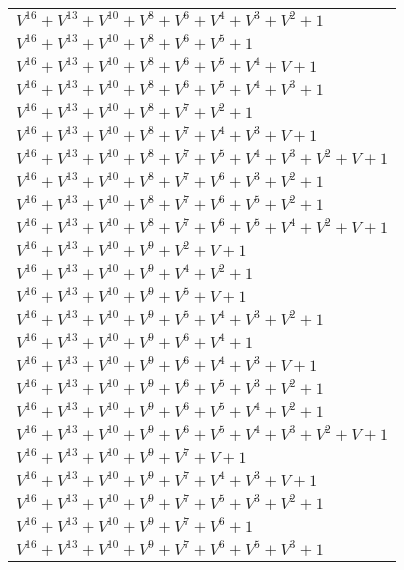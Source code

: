 \documentclass[12pt]{article}
\begin{document}
\begin{adjustwidth}{-4cm}{}
\begin{center}
\begin{longtable}{|l|}
$V^{16}  +V^{13}  +V^{10}  +V^{8}  +V^{6}  +V^{4}  +V^{3}  +V^{2}  + 1$ \\
$V^{16}  +V^{13}  +V^{10}  +V^{8}  +V^{6}  +V^{5}  + 1$ \\
$V^{16}  +V^{13}  +V^{10}  +V^{8}  +V^{6}  +V^{5}  +V^{4}  + V + 1$ \\
$V^{16}  +V^{13}  +V^{10}  +V^{8}  +V^{6}  +V^{5}  +V^{4}  +V^{3}  + 1$ \\
$V^{16}  +V^{13}  +V^{10}  +V^{8}  +V^{7}  +V^{2}  + 1$ \\
$V^{16}  +V^{13}  +V^{10}  +V^{8}  +V^{7}  +V^{4}  +V^{3}  + V + 1$ \\
$V^{16}  +V^{13}  +V^{10}  +V^{8}  +V^{7}  +V^{5}  +V^{4}  +V^{3}  +V^{2}  + V + 1$ \\
$V^{16}  +V^{13}  +V^{10}  +V^{8}  +V^{7}  +V^{6}  +V^{3}  +V^{2}  + 1$ \\
$V^{16}  +V^{13}  +V^{10}  +V^{8}  +V^{7}  +V^{6}  +V^{5}  +V^{2}  + 1$ \\
$V^{16}  +V^{13}  +V^{10}  +V^{8}  +V^{7}  +V^{6}  +V^{5}  +V^{4}  +V^{2}  + V + 1$ \\
$V^{16}  +V^{13}  +V^{10}  +V^{9}  +V^{2}  + V + 1$ \\
$V^{16}  +V^{13}  +V^{10}  +V^{9}  +V^{4}  +V^{2}  + 1$ \\
$V^{16}  +V^{13}  +V^{10}  +V^{9}  +V^{5}  + V + 1$ \\
$V^{16}  +V^{13}  +V^{10}  +V^{9}  +V^{5}  +V^{4}  +V^{3}  +V^{2}  + 1$ \\
$V^{16}  +V^{13}  +V^{10}  +V^{9}  +V^{6}  +V^{4}  + 1$ \\
$V^{16}  +V^{13}  +V^{10}  +V^{9}  +V^{6}  +V^{4}  +V^{3}  + V + 1$ \\
$V^{16}  +V^{13}  +V^{10}  +V^{9}  +V^{6}  +V^{5}  +V^{3}  +V^{2}  + 1$ \\
$V^{16}  +V^{13}  +V^{10}  +V^{9}  +V^{6}  +V^{5}  +V^{4}  +V^{2}  + 1$ \\
$V^{16}  +V^{13}  +V^{10}  +V^{9}  +V^{6}  +V^{5}  +V^{4}  +V^{3}  +V^{2}  + V + 1$ \\
$V^{16}  +V^{13}  +V^{10}  +V^{9}  +V^{7}  + V + 1$ \\
$V^{16}  +V^{13}  +V^{10}  +V^{9}  +V^{7}  +V^{4}  +V^{3}  + V + 1$ \\
$V^{16}  +V^{13}  +V^{10}  +V^{9}  +V^{7}  +V^{5}  +V^{3}  +V^{2}  + 1$ \\
$V^{16}  +V^{13}  +V^{10}  +V^{9}  +V^{7}  +V^{6}  + 1$ \\
$V^{16}  +V^{13}  +V^{10}  +V^{9}  +V^{7}  +V^{6}  +V^{5}  +V^{3}  + 1$ \\

\end{longtable}
\end{center}
\end{adjustwidth}
\end{document}

